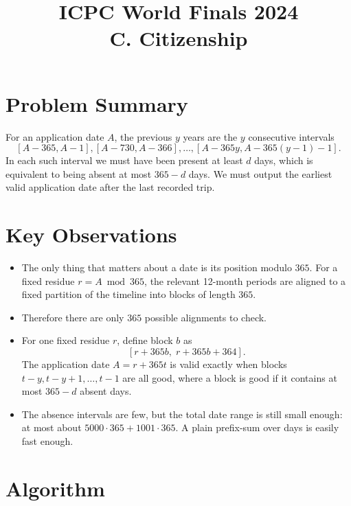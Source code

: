 \documentclass[11pt]{article}
\title{ICPC World Finals 2024\\C. Citizenship}
\author{}
\date{}
\begin{document}
\maketitle

\section*{Problem Summary}

For an application date $A$, the previous $y$ years are the $y$ consecutive intervals
\[
[A-365, A-1], [A-730, A-366], \dots, [A-365y, A-365(y-1)-1].
\]
In each such interval we must have been present at least $d$ days, which is equivalent to being absent at
most $365-d$ days. We must output the earliest valid application date after the last recorded trip.

\section*{Key Observations}

\begin{itemize}[leftmargin=*]
    \item The only thing that matters about a date is its position modulo $365$. For a fixed residue
    $r = A \bmod 365$, the relevant 12-month periods are aligned to a fixed partition of the timeline into
    blocks of length $365$.
    \item Therefore there are only $365$ possible alignments to check.
    \item For one fixed residue $r$, define block $b$ as
    \[
        [r + 365b,\; r + 365b + 364].
    \]
    The application date $A = r + 365t$ is valid exactly when blocks
    $t-y, t-y+1, \dots, t-1$ are all good, where a block is good if it contains at most $365-d$ absent days.
    \item The absence intervals are few, but the total date range is still small enough: at most about
    $5000 \cdot 365 + 1001 \cdot 365$. A plain prefix-sum over days is easily fast enough.
\end{itemize}

\section*{Algorithm}
\end{document}
